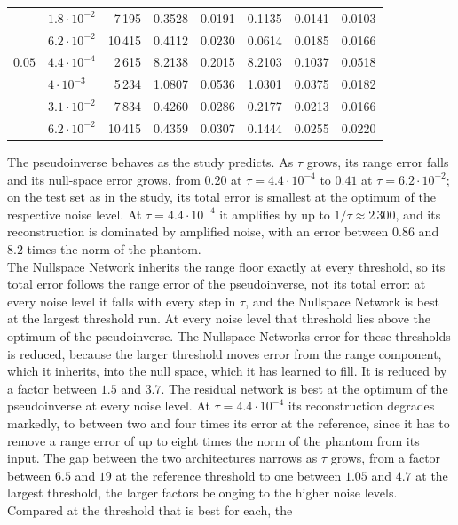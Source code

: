 \documentclass{article}
\numberwithin{equation}{section}
\begin{document}
\begin{table}[htbp]
\begin{tabular}{l l r rrr rr}
        & $1.8\cdot10^{-2}$ & 7\,195  & 0.3528 & 0.0191 & 0.1135 & 0.0141 & 0.0103 \\
        & $6.2\cdot10^{-2}$ & 10\,415 & 0.4112 & 0.0230 & 0.0614 & 0.0185 & 0.0166 \\
\midrule
$0.05$  & $4.4\cdot10^{-4}$ & 2\,615  & 8.2138 & 0.2015 & 8.2103 & 0.1037 & 0.0518 \\
        & $4\cdot10^{-3}$   & 5\,234  & 1.0807 & 0.0536 & 1.0301 & 0.0375 & 0.0182 \\
        & $3.1\cdot10^{-2}$ & 7\,834  & 0.4260 & 0.0286 & 0.2177 & 0.0213 & 0.0166 \\
        & $6.2\cdot10^{-2}$ & 10\,415 & 0.4359 & 0.0307 & 0.1444 & 0.0255 & 0.0220 \\
\bottomrule
\end{tabular}
\end{table}
The pseudoinverse behaves as the study predicts. As $\tau$ grows, its range error falls and its
null-space error grows, from $0.20$ at $\tau=4.4\cdot10^{-4}$ to $0.41$ at $\tau=6.2\cdot10^{-2}$; on the
test set as in the study, its total error is smallest at the optimum of the respective noise level. At
$\tau=4.4\cdot10^{-4}$ it amplifies by up to $1/\tau\approx2\,300$, and its reconstruction is dominated by
amplified noise, with an error between $0.86$ and $8.2$ times the norm of the phantom.\\
The Nullspace Network inherits the range floor exactly at every threshold, so its total error follows
the range error of the pseudoinverse, not its total error: at every noise level it falls with every step
in $\tau$, and the Nullspace Network is best at the largest threshold run. At every noise level that threshold lies above the optimum of the pseudoinverse.
The Nullspace Networks error for these thresholds is reduced, because the larger threshold moves error from the range component, which it inherits,
into the null space, which it has learned to fill. It is reduced by a factor between $1.5$ and $3.7$. 
The residual network is best at the optimum of the pseudoinverse at
every noise level. At $\tau=4.4\cdot10^{-4}$ its reconstruction degrades markedly, to between two and four
times its error at the reference, since it has to remove a range error of up to eight times the norm of the
phantom from its input. The gap between the two architectures narrows as $\tau$ grows, from a factor between
$6.5$ and $19$ at the reference threshold to one between $1.05$ and $4.7$ at the largest threshold, the
larger factors belonging to the higher noise levels. Compared at the threshold that is best for each, the
\end{document}
